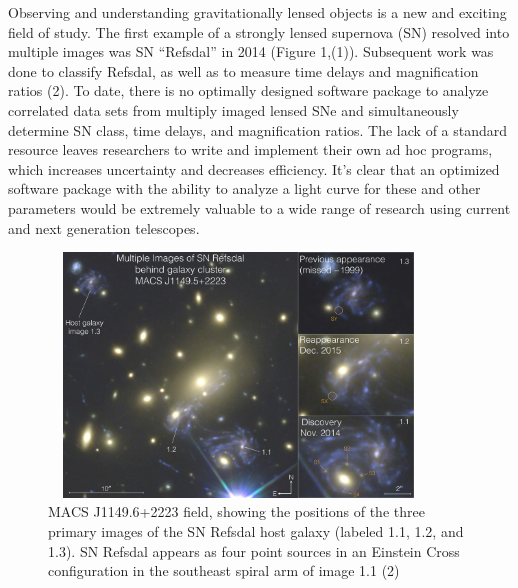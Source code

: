 \thispagestyle{fancy}
\lhead{}
\rhead{}
\renewcommand{\headrulewidth}{1pt}
\renewcommand{\footrulewidth}{0pt}
\newcommand{\packageName}{\textit{SNTD}}

\fancyfoot[C]{}

\pagestyle{fancy}

Observing and understanding gravitationally lensed objects is a new and exciting field of study. The first example of a strongly lensed supernova (SN) resolved into multiple images was SN ``Refsdal'' in 2014 (Figure 1,(1)). Subsequent work was done to classify Refsdal, as well as to measure time delays and magnification ratios (2). To date, there is no optimally designed software package to analyze correlated data sets from multiply imaged lensed SNe and simultaneously determine SN class, time delays, and magnification ratios. The lack of a standard resource leaves researchers to write and implement their own ad hoc programs, which increases uncertainty and decreases efficiency. It's clear that an optimized software package with the ability to analyze a light curve for these and other parameters would be extremely valuable to a wide range of research using current and next generation telescopes. 
\begin{figure}[h]
\centering
\includegraphics[width=0.9\textwidth,height=6.5cm]{refsdal_rodney.pdf}
\caption{MACS J1149.6+2223 field, showing the positions of the three primary images of the SN Refsdal host galaxy (labeled 1.1, 1.2, and 1.3). SN Refsdal appears as four point sources in an Einstein Cross configuration in the southeast spiral arm of image 1.1 (2)}
\end{figure}


